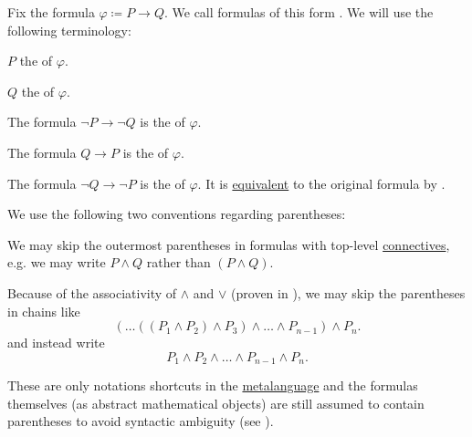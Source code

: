 \begin{definition}\label{def:material_implication}
  Fix the formula \( \varphi \coloneqq P \rightarrow Q \). We call formulas of this form . We will use the following terminology:

  \begin{DefEnum}
     \( P \) the  of \( \varphi \).

     \( Q \) the  of \( \varphi \).

     The formula \( \neg P \rightarrow \neg Q \) is the  of \( \varphi \).

     The formula \( Q \rightarrow P \) is the  of \( \varphi \).

     The formula \( \neg Q \rightarrow \neg P \) is the  of \( \varphi \). It is \hyperref[def:propositional_interpretation/equivalence]{equivalent} to the original formula by .
  \end{DefEnum}
\end{definition}

\begin{remark}\label{remark:propositional_formula_parentheses}
  We use the following two conventions regarding parentheses:
  \begin{RemEnum}
     We may skip the outermost parentheses in formulas with top-level \hyperref[def:propositional_alphabet/connectives]{connectives}, e.g. we may write \( P \wedge Q \) rather than \( (P \wedge Q) \).

     Because of the associativity of \( \wedge \) and \( \vee \) (proven in ), we may skip the parentheses in chains like
    \begin{equation*}
      ( \ldots ((P_1 \wedge P_2) \wedge P_3) \wedge \ldots \wedge P_{n-1} ) \wedge P_n.
    \end{equation*}
    and instead write
    \begin{equation*}
      P_1 \wedge P_2 \wedge \ldots \wedge P_{n-1} \wedge P_n.
    \end{equation*}
  \end{RemEnum}

  These are only notations shortcuts in the \hyperref[remark:metalanguage]{metalanguage} and the formulas themselves (as abstract mathematical objects) are still assumed to contain parentheses to avoid syntactic ambiguity (see ).
\end{remark}

